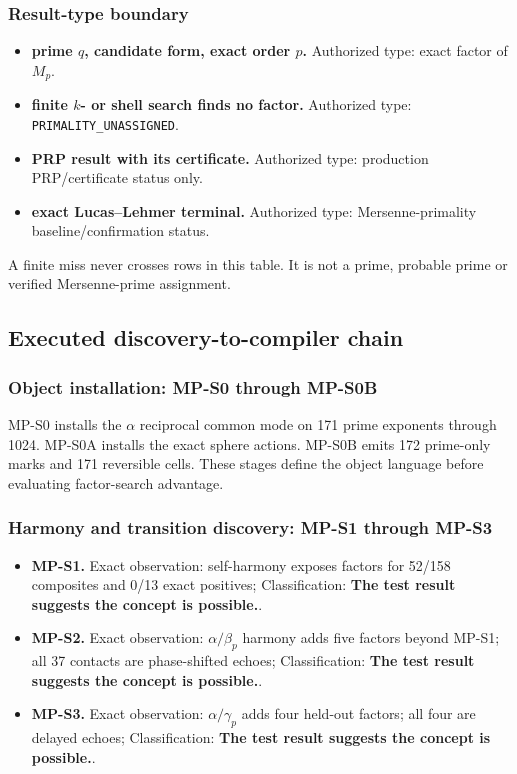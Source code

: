 \subsubsection{Result-type boundary}\label{viii-ch10-result-type-boundary}

\begin{itemize}
\tightlist
\item
  \textbf{prime \(q\), candidate form, exact order \(p\).} Authorized
  type: exact factor of \(M_p\).
\item
  \textbf{finite \(k\)- or shell search finds no factor.} Authorized
  type: \texttt{PRIMALITY\_UNASSIGNED}.
\item
  \textbf{PRP result with its certificate.} Authorized type: production
  PRP/certificate status only.
\item
  \textbf{exact Lucas--Lehmer terminal.} Authorized type:
  Mersenne-primality baseline/confirmation status.
\end{itemize}

A finite miss never crosses rows in this table. It is not a prime,
probable prime or verified Mersenne-prime assignment.

\subsection{Executed discovery-to-compiler
chain}\label{viii-ch10-executed-discovery-to-compiler-chain}

\subsubsection{Object installation: MP-S0 through
MP-S0B}\label{viii-ch10-object-installation-mp-s0-through-mp-s0b}

MP-S0 installs the \(\alpha\) reciprocal common mode on 171 prime
exponents through 1024. MP-S0A installs the exact sphere actions. MP-S0B
emits 172 prime-only marks and 171 reversible cells. These stages define
the object language before evaluating factor-search advantage.

\subsubsection{Harmony and transition discovery: MP-S1 through
MP-S3}\label{viii-ch10-harmony-and-transition-discovery-mp-s1-through-mp-s3}

\begin{itemize}
\tightlist
\item
  \textbf{MP-S1.} Exact observation: self-harmony exposes factors for
  52/158 composites and 0/13 exact positives; Classification:
  \textbf{The test result suggests the concept is possible.}.
\item
  \textbf{MP-S2.} Exact observation: \(\alpha/\beta_p\) harmony adds
  five factors beyond MP-S1; all 37 contacts are phase-shifted echoes;
  Classification: \textbf{The test result suggests the concept is
  possible.}.
\item
  \textbf{MP-S3.} Exact observation: \(\alpha/\gamma_p\) adds four
  held-out factors; all four are delayed echoes; Classification:
  \textbf{The test result suggests the concept is possible.}.
\end{itemize}

